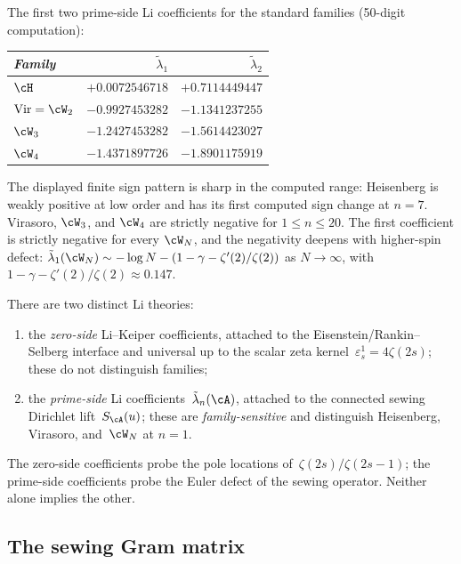 \begin{remark}%
\label{rem:li-numerical-two-theories}%
%
%
The first two prime-side Li coefficients for the standard
families (50-digit computation):
\begin{center}
\small
\renewcommand{\arraystretch}{1.2}
\begin{tabular}{lrr}
\toprule
\emph{Family} & $\tilde\lambda_1$ & $\tilde\lambda_2$ \\
\midrule
$\cH$ & $+0.0072546718$ & $+0.7114449447$ \\
$\mathrm{Vir} = \cW_2$ & $-0.9927453282$ & $-1.1341237255$ \\
$\cW_3$ & $-1.2427453282$ & $-1.5614423027$ \\
$\cW_4$ & $-1.4371897726$ & $-1.8901175919$ \\
\bottomrule
\end{tabular}
\end{center}
The displayed finite sign pattern is sharp in the computed range:
Heisenberg is weakly positive at low order and has its first computed
sign change at $n = 7$.  Virasoro, $\cW_3$, and $\cW_4$ are strictly
negative for $1\leq n\leq20$. The first coefficient is strictly
negative for every $\cW_N$, and the negativity deepens with
higher-spin defect:
$\tilde\lambda_1(\cW_N) \sim -\log N
- (1 - \gamma - \zeta'(2)/\zeta(2))$
as $N \to \infty$, with
$1 - \gamma - \zeta'(2)/\zeta(2) \approx 0.147$.

There are two distinct Li theories:
\begin{enumerate}[label=\textup{(\roman*)}]
\item
the \emph{zero-side} Li--Keiper coefficients, attached to the
Eisenstein/Rankin--Selberg interface and universal up to the
scalar zeta kernel~$\varepsilon^1_s = 4\zeta(2s)$; these do
not distinguish families;
\item
the \emph{prime-side} Li coefficients~$\tilde\lambda_n(\cA)$,
attached to the connected sewing Dirichlet
lift~$S_\cA(u)$; these are
\emph{family-sensitive} and distinguish Heisenberg, Virasoro,
and~$\cW_N$ at $n = 1$.
\end{enumerate}
The zero-side coefficients probe the pole locations
of~$\zeta(2s)/\zeta(2s{-}1)$; the prime-side coefficients
probe the Euler defect of the sewing operator.
Neither alone implies the other.
\end{remark}

\subsection{The sewing Gram matrix}%
\label{subsec:surface-moment-matrix}%
\label{subsec:sewing-gram-matrix}%
%

